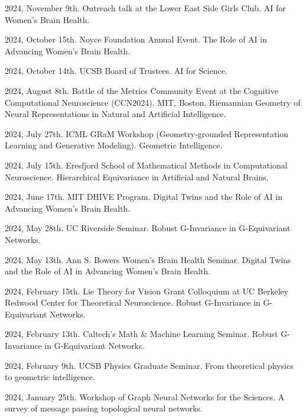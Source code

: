 2024, November 9th. Outreach talk at the Lower East Side Girls Club. AI for Women’s Brain Health.

2024, October 15th. Noyce Foundation Annual Event. The Role of AI in Advancing Women’s Brain Health.

2024, October 14th. UCSB Board of Trustees. AI for Science.

2024, August 8th. Battle of the Metrics Community Event at the Cognitive Computational Neuroscience (CCN2024). MIT, Boston. Riemannian Geometry of Neural Representations in Natural and Artificial Intelligence.

2024, July 27th. ICML GRaM Workshop (Geometry-grounded Representation Learning and Generative Modeling). Geometric Intelligence.

2024, July 15th. Eresfjord School of Mathematical Methods in Computational Neuroscience. Hierarchical Equivariance in Artificial and Natural Brains.

2024, June 17th. MIT DHIVE Program. Digital Twins and the Role of AI in Advancing Women’s Brain Health.

2024, May 28th. UC Riverside Seminar. Robust G-Invariance in G-Equivariant Networks.

2024, May 13th. Ann S. Bowers Women’s Brain Health Seminar. Digital Twins and the Role of AI in Advancing Women’s Brain Health.

2024, February 15th. Lie Theory for Vision Grant Colloquium at UC Berkeley Redwood Center for Theoretical Neuroscience. Robust G-Invariance in G-Equivariant Networks.

2024, February 13th. Caltech’s Math \& Machine Learning Seminar. Robust G-Invariance in G-Equivariant Networks.

2024, February 9th. UCSB Physics Graduate Seminar. From theoretical physics to geometric intelligence.

2024, January 25th. Workshop of Graph Neural Networks for the Sciences. A survey of message passing topological neural networks.